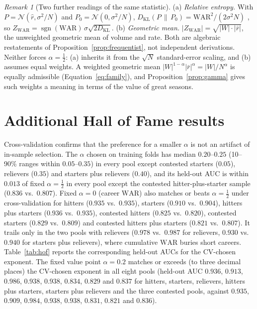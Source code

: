 \documentclass[11pt,letterpaper]{article}
\theoremstyle{plain}
\theoremstyle{definition}
\theoremstyle{remark}
\newtheorem{remark}{Remark}
\newcommand{\WAR}{\mathrm{WAR}}
\newcommand{\ZWAR}{Z_{\WAR}}
\newcommand{\DKL}{D_{\mathrm{KL}}}
\newcommand{\N}{\mathcal{N}}
\newcommand{\sgn}{\operatorname{sgn}}
\begin{document}
\begin{remark}[Two further readings of the same statistic]
\label{rem:interp}
(a) \emph{Relative entropy.} With $P = \N(\hat r, \sigma^2/N)$ and $P_0 = \N(0, \sigma^2/N)$, $\DKL(P\,\|\,P_0) = \WAR^2/(2\sigma^2 N)$ \cite{kullback1951}, so $\ZWAR = \sgn(\WAR)\,\sigma\sqrt{2\DKL}$.
(b) \emph{Geometric mean.} $|\ZWAR| = \sqrt{|W|\cdot|\bar r|}$, the unweighted geometric mean of volume and rate.
Both are algebraic restatements of Proposition~\ref{prop:frequentist}, not independent derivations. Neither forces $\alpha = \tfrac12$: (a) inherits it from the $\sqrt N$ standard-error scaling, and (b) assumes equal weights. A weighted geometric mean $|W|^{1-\alpha}|\bar r|^{\alpha} = |W|/N^{\alpha}$ is equally admissible (Equation~\eqref{eq:family}), and Proposition~\ref{prop:gamma} gives such weights a meaning in terms of the value of great seasons.
\end{remark}

\section{Additional Hall of Fame results}
\label{app:hof}

Cross-validation confirms that the preference for a smaller $\alpha$ is not an artifact of in-sample selection. The $\alpha$ chosen on training folds has median $0.20$--$0.25$ (10--90\% ranges within $0.05$--$0.35$) in every pool except contested starters ($0.05$), relievers ($0.35$) and starters plus relievers ($0.40$), and its held-out AUC is within $0.013$ of fixed $\alpha = \tfrac12$ in every pool except the contested hitter-plus-starter sample ($0.836$ vs.\ $0.807$). Fixed $\alpha = 0$ (career $\WAR$) also matches or beats $\alpha = \tfrac12$ under cross-validation for hitters ($0.935$ vs.\ $0.935$), starters ($0.910$ vs.\ $0.904$), hitters plus starters ($0.936$ vs.\ $0.935$), contested hitters ($0.825$ vs.\ $0.820$), contested starters ($0.829$ vs.\ $0.809$) and contested hitters plus starters ($0.821$ vs.\ $0.807$). It trails only in the two pools with relievers ($0.978$ vs.\ $0.987$ for relievers, $0.930$ vs.\ $0.940$ for starters plus relievers), where cumulative $\WAR$ buries short careers. Table~\ref{tab:hof} reports the corresponding held-out AUCs for the CV-chosen exponent. The fixed value point $\alpha = 0.2$ matches or exceeds (to three decimal places) the CV-chosen exponent in all eight pools (held-out AUC $0.936$, $0.913$, $0.986$, $0.938$, $0.938$, $0.834$, $0.829$ and $0.837$ for hitters, starters, relievers, hitters plus starters, starters plus relievers and the three contested pools, against $0.935$, $0.909$, $0.984$, $0.938$, $0.938$, $0.831$, $0.821$ and $0.836$).
\end{document}
